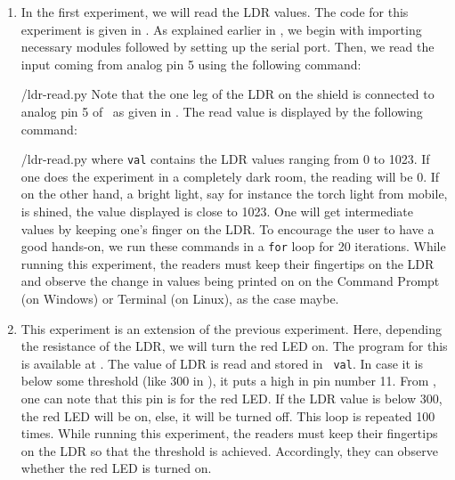 \begin{enumerate}
  \item In the first experiment, we will read the LDR values. The code for this experiment is given in
        . As explained earlier in , we begin with 
        importing necessary modules followed by setting up the serial port. 
        Then, we read the input coming from analog pin 5 using the
        following command:
        
        {\LocLDRpycode/ldr-read.py} Note that the one leg of the LDR on
        the shield is connected to analog pin 5 of \arduino\, 
        as given in . The read value is displayed 
        by the following command: 
        
        {\LocLDRpycode/ldr-read.py} where {\tt val} contains
        the LDR values ranging from 0 to 1023. If one does the experiment in a completely dark room, the
        reading will be 0. If on the other hand, a bright light, say for instance the torch
        light from mobile, is shined, the value displayed is close to 1023. One will get
        intermediate values by keeping one's finger on the LDR. To
        encourage the user to have a good hands-on, we run these commands in
        a {\tt for} loop for 20 iterations. While running this experiment, the readers must keep their fingertips on the LDR and
        observe the change in values being printed on on the
        Command Prompt (on Windows) or Terminal (on Linux), as the case maybe.
        
  \item This experiment is an extension of the previous experiment. Here, depending the resistance of the LDR, we will
        turn the red LED on.  The program for this is available at
        .  The value of LDR is read and stored in {\tt
            val}.  In case it is below some threshold (like 300 in ), 
        it puts a high in pin number 11.  From , 
        one can note that this pin is for the red LED.  If the LDR value is below 300, 
        the red LED will be on, else, it will be turned off.  
        This loop is repeated 100 times. While running this experiment, the readers 
        must keep their fingertips on the LDR so that the threshold is achieved. Accordingly, 
        they can observe whether the red LED is turned on. 
        

\end{enumerate}
